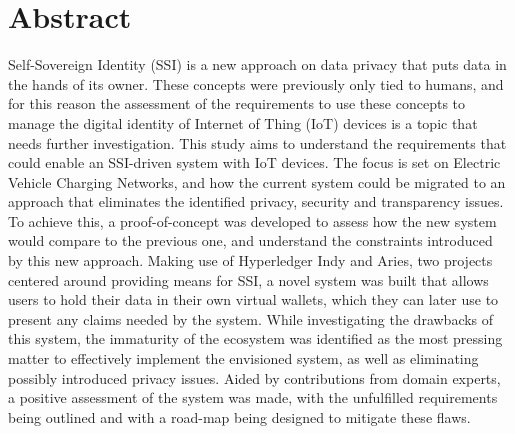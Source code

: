 \thispagestyle{acknowledgements}
\section*{Abstract}
\label{sec:abstract}

Self-Sovereign Identity (SSI) is a new approach on data privacy that puts data in the hands of its owner. These concepts were previously only tied to humans, and for this reason the assessment of the requirements to use these concepts to manage the digital identity of Internet of Thing (IoT) devices is a topic that needs further investigation. This study aims to understand the requirements that could enable an SSI-driven system with IoT devices. The focus is set on Electric Vehicle Charging Networks, and how the current system could be migrated to an approach that eliminates the identified privacy, security and transparency issues. To achieve this, a proof-of-concept was developed to assess how the new system would compare to the previous one, and understand the constraints introduced by this new approach. Making use of Hyperledger Indy and Aries, two projects centered around providing means for SSI, a novel system was built that allows users to hold their data in their own virtual wallets, which they can later use to present any claims needed by the system. While investigating the drawbacks of this system, the immaturity of the ecosystem was identified as the most pressing matter to effectively implement the envisioned system, as well as eliminating possibly introduced privacy issues. Aided by contributions from domain experts, a positive assessment of the system was made, with the unfulfilled requirements being outlined and with a road-map being designed to mitigate these flaws. 

